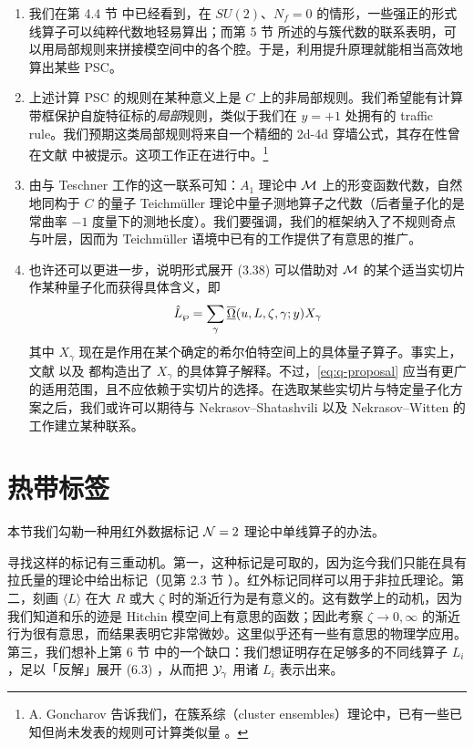 \begin{enumerate}
\item 我们在第 4.4 节%
中已经看到，在 $SU(2)$、$N_f=0$ 的情形，一些强正的形式线算子可以纯粹代数地轻易算出；而第 5 节%
所述的与簇代数的联系表明，可以用局部规则来拼接模空间中的各个腔。于是，利用提升原理就能相当高效地算出某些 PSC。

\item 上述计算 PSC 的规则在某种意义上是 $C$ 上的非局部规则。我们希望能有计算带框保护自旋特征标的\emph{局部}规则，类似于我们在 $y=+1$ 处拥有的 traffic rule。我们预期这类局部规则将来自一个精细的 2d-4d 穿墙公式，其存在性曾在文献 \cite{Gaiotto:2009fs} 中被提示。这项工作正在进行中。\footnote{A. Goncharov 告诉我们，在簇系综（cluster ensembles）理论中，已有一些已知但尚未发表的规则可计算类似量 \cite{MR2567745}。}

\item 由与 Teschner 工作的这一联系可知：$A_1$ 理论中 $\mathcal{M}$ 上的形变函数代数，自然地同构于 $C$ 的量子 Teichm\"uller 理论中量子测地算子之代数（后者量子化的是常曲率 $-1$ 度量下的测地长度）。我们要强调，我们的框架纳入了不规则奇点与叶层，因而为 Teichm\"uller 语境中已有的工作提供了有意思的推广。

\item 也许还可以更进一步，说明形式展开 (3.38) %
可以借助对 $\mathcal{M}$ 的某个适当实切片作某种量子化而获得具体含义，即
\begin{equation}\label{eq:q-proposal}
\hat L_\wp = \sum_\gamma \overline{\underline{\Omega}}(u,L,\zeta,\gamma;y) X_\gamma
\end{equation}
其中 $X_\gamma$ 现在是作用在某个确定的希尔伯特空间上的具体量子算子。事实上，文献 \cite{Teschner:2005bz} 以及 \cite{MR2567745,clqd2,qd-cluster} 都构造出了 $X_\gamma$ 的具体算子解释。不过，\eqref{eq:q-proposal} 应当有更广的适用范围，且不应依赖于实切片的选择。在选取某些实切片与特定量子化方案之后，我们或许可以期待与 Nekrasov--Shatashvili \cite{Nekrasov:2009ui,Nekrasov:2009rc} 以及 Nekrasov--Witten \cite{Nekrasov:2010ka} 的工作建立某种联系。
\end{enumerate}

\section{热带标签}\label{sec:Tropic}

本节我们勾勒一种用红外数据标记 $\mathcal{N}=2$ 理论中单线算子的办法。

寻找这样的标记有三重动机。第一，这种标记是可取的，因为迄今我们只能在具有拉氏量的理论中给出标记（见第 2.3 节%
）。红外标记同样可以用于非拉氏理论。第二，刻画 $\langle L\rangle$ 在大 $R$ 或大 $\zeta$ 时的渐近行为是有意义的。这有数学上的动机，因为我们知道和乐的迹是 Hitchin 模空间上有意思的函数；因此考察 $\zeta\to 0,\infty$ 的渐近行为很有意思，而结果表明它非常微妙。这里似乎还有一些有意思的物理学应用。第三，我们想补上第 6 节%
中的一个缺口：我们想证明存在足够多的不同线算子 $L_i$，足以「反解」展开 (6.3)%
，从而把 $\mathcal{Y}_\gamma$ 用诸 $L_i$ 表示出来。

